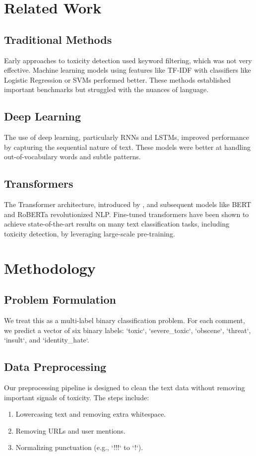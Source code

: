 \documentclass[11pt]{article}
\begin{document}
\section{Related Work}

\subsection{Traditional Methods}
Early approaches to toxicity detection used keyword filtering, which was not very effective. Machine learning models using features like TF-IDF with classifiers like Logistic Regression or SVMs performed better. These methods established important benchmarks but struggled with the nuances of language.

\subsection{Deep Learning}
The use of deep learning, particularly RNNs and LSTMs, improved performance by capturing the sequential nature of text. These models were better at handling out-of-vocabulary words and subtle patterns.

\subsection{Transformers}
The Transformer architecture, introduced by \citet{vaswani2017attention}, and subsequent models like BERT \cite{bert} and RoBERTa \cite{roberta} revolutionized NLP. Fine-tuned transformers have been shown to achieve state-of-the-art results on many text classification tasks, including toxicity detection, by leveraging large-scale pre-training.

\section{Methodology}

\subsection{Problem Formulation}
We treat this as a multi-label binary classification problem. For each comment, we predict a vector of six binary labels: `toxic`, `severe_toxic`, `obscene`, `threat`, `insult`, and `identity_hate`.

\subsection{Data Preprocessing}
Our preprocessing pipeline is designed to clean the text data without removing important signals of toxicity. The steps include:
\begin{enumerate}
    \item Lowercasing text and removing extra whitespace.
    \item Removing URLs and user mentions.
    \item Normalizing punctuation (e.g., `!!!` to `!`).
\end{enumerate}
\end{document}
